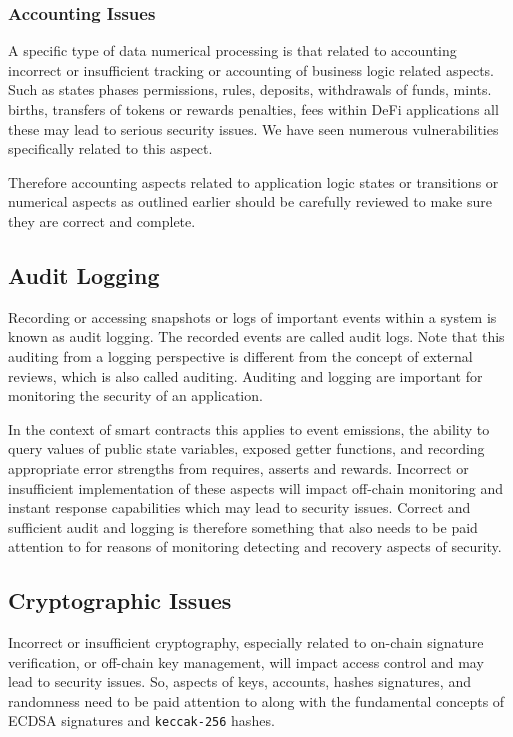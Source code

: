 \subsubsection{Accounting Issues}\label{accounting-issues}

A specific type of data numerical processing is that related to
accounting incorrect or insufficient tracking or accounting of business
logic related aspects. Such as states phases permissions, rules,
deposits, withdrawals of funds, mints. births, transfers of tokens or
rewards penalties, fees within DeFi applications all these may lead to
serious security issues. We have seen numerous vulnerabilities
specifically related to this aspect.

Therefore accounting aspects related to application logic states or
transitions or numerical aspects as outlined earlier should be carefully
reviewed to make sure they are correct and complete.

\subsection{Audit Logging}\label{audit-logging}

Recording or accessing snapshots or logs of important events within a
system is known as audit logging. The recorded events are called audit
logs. Note that this auditing from a logging perspective is different
from the concept of external reviews, which is also called auditing.
Auditing and logging are important for monitoring the security of an
application.

In the context of smart contracts this applies to event emissions, the
ability to query values of public state variables, exposed getter
functions, and recording appropriate error strengths from requires,
asserts and rewards. Incorrect or insufficient implementation of these
aspects will impact off-chain monitoring and instant response
capabilities which may lead to security issues. Correct and sufficient
audit and logging is therefore something that also needs to be paid
attention to for reasons of monitoring detecting and recovery aspects of
security.

\subsection{Cryptographic Issues}\label{cryptographic-issues}

Incorrect or insufficient cryptography, especially related to on-chain
signature verification, or off-chain key management, will impact access
control and may lead to security issues. So, aspects of keys, accounts,
hashes signatures, and randomness need to be paid attention to along
with the fundamental concepts of ECDSA signatures and
\texttt{keccak-256} hashes.

